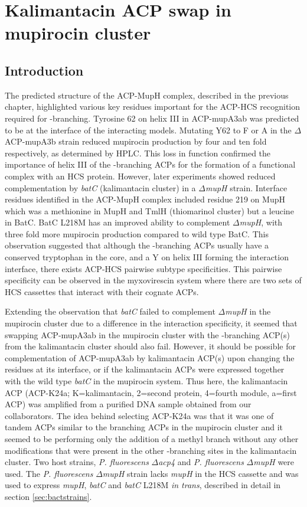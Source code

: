 \chapter{Kalimantacin ACP swap in mupirocin cluster}
\label{cha:chap4}

\section{Introduction}
\label{sec:chap4-Intro}
The predicted structure of the ACP-MupH complex, described in the previous chapter, highlighted various key residues important for the ACP-HCS recognition required for \bet-branching. Tyrosine 62 on helix III in ACP-mupA3ab was predicted to be at the interface of the interacting models. Mutating Y62 to F or A in the $ \Delta $ACP-mupA3b strain reduced mupirocin production by four and ten fold respectively, as determined by HPLC. This loss in function confirmed the importance of helix III of the \bet-branching ACPs for the formation of a functional complex with an HCS protein. However, later experiments showed reduced complementation by \textit{batC} (kalimantacin cluster) in a $ \Delta $\textit{mupH} strain. Interface residues identified in the ACP-MupH complex included residue 219 on MupH which was a methionine in MupH and TmlH (thiomarinol cluster) but a leucine in BatC. BatC L218M has an improved ability to complement $ \Delta $\textit{mupH}, with three fold more mupirocin production compared to wild type BatC. This observation suggested that although the \bet-branching ACPs usually have a conserved tryptophan in the core, and a Y on helix III forming the interaction interface, there exists ACP-HCS pairwise subtype specificities. This pairwise specificity can be observed in the myxovirescin system where there are two sets of HCS cassettes that interact with their cognate ACPs.

Extending the observation that \textit{batC} failed to complement $ \Delta $\textit{mupH} in the mupirocin cluster due to a difference in the interaction specificity, it seemed that swapping ACP-mupA3ab in the mupirocin cluster with the \bet-branching ACP(s) from the kalimantacin cluster should also fail. However, it should be possible for complementation of ACP-mupA3ab by kalimantacin ACP(s) upon changing the residues at its interface, or if the kalimantacin ACPs were expressed together with the wild type \textit{batC} in the mupirocin system. Thus here, the kalimantacin ACP (ACP-K24a; K=kalimantacin, 2=second protein, 4=fourth module, a=first ACP) was amplified from a purified DNA sample obtained from our collaborators. The idea behind selecting ACP-K24a was that it was one of tandem ACPs similar to the branching ACPs in the  mupirocin cluster and it seemed to be performing only the addition of a methyl branch without any other modifications that were present in the other \bet-branching sites in the kalimantacin cluster. Two host strains,  \textit{P. fluorescens} $ \Delta $\textit{acp4} and \textit{P. fluorescens} $ \Delta $\textit{mupH} were used. The \textit{P. fluorescens} $ \Delta $\textit{mupH} strain lacks \textit{mupH} in the HCS cassette and was used to express \textit{mupH}, \textit{batC} and \textit{batC} L218M \textit{in trans}, described in detail in section \ref{sec:bactstrains}. 

